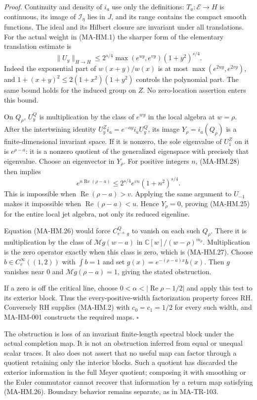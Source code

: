 \emph{Proof.}
Continuity and density of $i_a$ use only the definitions:
$T_a:\mathcal E\to H$ is continuous, its image of
$\mathcal I_\eta$ lies in $J$, and its range contains
the compact smooth functions.  The ideal and its
Hilbert closure are invariant under all translations.
For the actual weight in (MA-HM.1) the sharper form
of the elementary translation estimate is
\[
 \|U_y\|_{H\to H}
 \le 2^{s/4}\max(e^{uy},e^{vy})(1+y^2)^{s/4}.
 \tag{MA-HM.28}
\]
Indeed the exponential part of $w(x+y)/w(x)$ is at
most $\max(e^{2uy},e^{2vy})$, and
$1+(x+y)^2\le2(1+x^2)(1+y^2)$ controls the polynomial
part.  The same bound holds for the induced group
on $Z$.  No zero-location assertion enters this bound.

On $Q_\rho$, $U_y^Q$ is multiplication by the class
of $e^{wy}$ in the local algebra at $w=\rho$.
After the intertwining identity
$U_y^Zi_a=e^{-ay}i_aU_y^Q$, its image
$Y_\rho=i_a(Q_\rho)$ is a finite-dimensional invariant
space.  If it is nonzero, the sole eigenvalue of
$U_1^Z$ on it is $e^{\rho-a}$: it is a nonzero
quotient of the generalized eigenspace with precisely
that eigenvalue.  Choose an eigenvector in $Y_\rho$.
For positive integers $n$, (MA-HM.28) then implies
\[
       e^{n\operatorname{Re}(\rho-a)}
          \le 2^{s/4}e^{vn}(1+n^2)^{s/4}.
 \tag{MA-HM.29}
\]
This is impossible when
$\operatorname{Re}(\rho-a)>v$.
Applying the same argument to $U_{-1}$ makes it
impossible when $\operatorname{Re}(\rho-a)<u$.
Hence $Y_\rho=0$, proving (MA-HM.25) for the entire
local jet algebra, not only its reduced eigenline.

Equation (MA-HM.26) would force
$C_{e^{-a\cdot}g}^Q$ to vanish on each such $Q_\rho$.
There it is multiplication by the class of
$\mathcal Mg(w-a)$ in
$\mathbb C[w]/(w-\rho)^{m_\rho}$.
Multiplication is the zero operator exactly when
this class is zero, which is (MA-HM.27).
Choose $b\in C_c^\infty((1,2))$ with $\int b=1$
and set $g(x)=e^{-(\rho-a)x}b(x)$.
Then $g$ vanishes near $0$ and
$\mathcal Mg(\rho-a)=1$, giving the stated obstruction.

If a zero is off the critical line, choose
$0<\alpha<|\operatorname{Re}\rho-1/2|$ and apply
this test to its exterior block.  Thus the
every-positive-width factorization property forces
RH.  Conversely RH supplies (MA-HM.2) with
$c_0=c_1=1/2$ for every such width, and MA-HM-001
constructs the required maps.
\hfill$\square$

The obstruction is loss of an invariant finite-length
spectral block under the actual completion map.
It is not an obstruction inferred from equal or
unequal scalar traces.  It also does not assert that
no useful map can factor through a quotient retaining
only the interior blocks.  Such a quotient has
discarded the exterior information in the full Meyer
quotient; composing it with smoothing or the Euler
commutator cannot recover that information by a
return map satisfying (MA-HM.26).
Boundary behavior remains separate, as in MA-TR-103.

